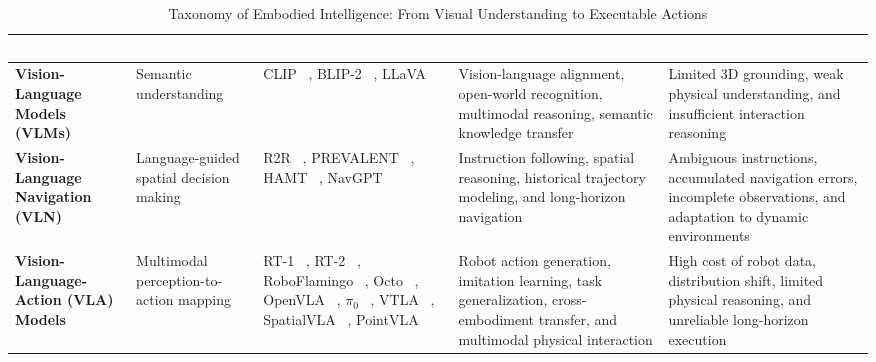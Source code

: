 \documentclass{SCIS2026}
\renewcommand{\arraystretch}{1.45}
\begin{document}
\begin{table}[!tbp]
\centering

\caption{
Taxonomy of Embodied Intelligence: From Visual Understanding to Executable Actions
}

\label{tab:embodied_taxonomy}

\footnotesize

\setlength{\tabcolsep}{3pt}
\renewcommand{\arraystretch}{1.3}


\begin{tabularx}{\textwidth}{
>{\centering\arraybackslash}p{2.1cm}
>{\centering\arraybackslash}p{2.2cm}
>{\centering\arraybackslash}p{3.0cm}
>{\centering\arraybackslash}X
>{\centering\arraybackslash}X
}

\toprule

\rowcolor{TableNavy}

\textcolor{white}{\textbf{Paradigm}}
&
\textcolor{white}{\textbf{Core Objective}}
&
\textcolor{white}{\textbf{Representative Works}}
&
\textcolor{white}{\textbf{Main Capabilities}}
&
\textcolor{white}{\textbf{Remaining Challenges}}
\\

\midrule

\textbf{Vision-Language Models (VLMs)}
&
Semantic understanding
&
CLIP ~\cite{radford2021clip}, 
BLIP-2 ~\cite{li2023blip}, 
LLaVA ~\cite{liu2023visual}
&
Vision-language alignment, open-world recognition, multimodal reasoning, semantic knowledge transfer
&
Limited 3D grounding, weak physical understanding, and insufficient interaction reasoning
\\

\textbf{Vision-Language Navigation (VLN)}
&
Language-guided spatial decision making
&
R2R ~\cite{anderson2018vision}, 
PREVALENT ~\cite{hao2020towards}, 
HAMT ~\cite{chen2021history}, 
NavGPT ~\cite{zhou2024navgpt}
&
Instruction following, spatial reasoning, historical trajectory modeling, and long-horizon navigation
&
Ambiguous instructions, accumulated navigation errors, incomplete observations, and adaptation to dynamic environments
\\

\textbf{Vision-Language-Action (VLA) Models}
&
Multimodal perception-to-action mapping
&
RT-1 ~\cite{brohan2022rt}, 
RT-2 ~\cite{zitkovich2023rt}, 
RoboFlamingo ~\cite{li2024vision}, 
Octo ~\cite{team2024octo}, 
OpenVLA ~\cite{kim2024openvla}, 
$\pi_0$ ~\cite{team2024pi0},
VTLA ~\cite{zhang2026vtla},
SpatialVLA ~\cite{qu2025spatialvla},
PointVLA ~\cite{li2026pointvla}
&
Robot action generation, imitation learning, task generalization, cross-embodiment transfer, and multimodal physical interaction
&
High cost of robot data, distribution shift, limited physical reasoning, and unreliable long-horizon execution
\\


\end{tabularx}
\end{table}
\end{document}

